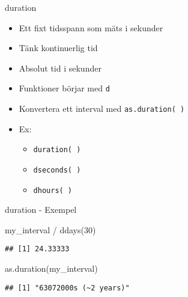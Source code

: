 \documentclass[
  11pt,
  ignorenonframetext,
  handout]{beamer}
\newenvironment{Shaded}{\begin{snugshade}}{\end{snugshade}}
\newcommand{\DecValTok}[1]{\textcolor[rgb]{0.00,0.00,0.81}{#1}}
\newcommand{\FunctionTok}[1]{\textcolor[rgb]{0.00,0.00,0.00}{#1}}
\newcommand{\NormalTok}[1]{#1}
\newcommand{\SpecialCharTok}[1]{\textcolor[rgb]{0.00,0.00,0.00}{#1}}
\providecommand{\tightlist}{%
  \setlength{\itemsep}{0pt}\setlength{\parskip}{0pt}}
\begin{document}
\begin{frame}{duration}
\protect\hypertarget{duration}{}
\begin{itemize}
\tightlist
\item
  Ett fixt tidsspann som mäts i sekunder
\item
  Tänk kontinuerlig tid
\item
  Absolut tid i sekunder
\item
  Funktioner börjar med \texttt{d}
\item
  Konvertera ett interval med \texttt{as.duration( )}
\item
  Ex:

  \begin{itemize}
  \tightlist
  \item
    \texttt{duration( )}
  \item
    \texttt{dseconds( )}
  \item
    \texttt{dhours( )}
  \end{itemize}
\end{itemize}
\end{frame}

\begin{frame}[fragile]{duration - Exempel}
\protect\hypertarget{duration---exempel}{}
\begin{Shaded}
\begin{Highlighting}[]
\NormalTok{my\_interval }\SpecialCharTok{/} \FunctionTok{ddays}\NormalTok{(}\DecValTok{30}\NormalTok{)}
\end{Highlighting}
\end{Shaded}

\begin{verbatim}
## [1] 24.33333
\end{verbatim}

\begin{Shaded}
\begin{Highlighting}[]
\FunctionTok{as.duration}\NormalTok{(my\_interval)}
\end{Highlighting}
\end{Shaded}

\begin{verbatim}
## [1] "63072000s (~2 years)"
\end{verbatim}
\end{frame}
\end{document}
